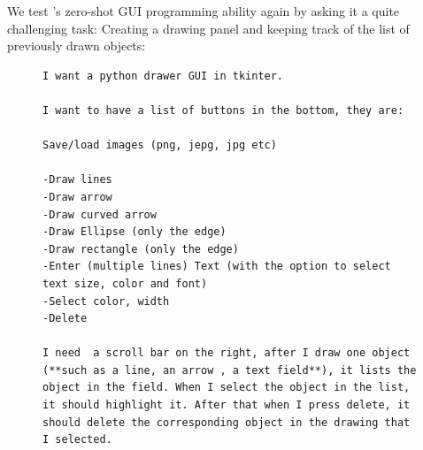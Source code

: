 We test \DV's zero-shot GUI programming ability again by asking it a quite challenging task: Creating a drawing panel and keeping track of the list of previously drawn objects:



\begin{figure}[H]
\begin{AIbox}{\DV}
\begin{verbatim}
I want a python drawer GUI in tkinter.

I want to have a list of buttons in the bottom, they are:

Save/load images (png, jepg, jpg etc)

-Draw lines
-Draw arrow
-Draw curved arrow
-Draw Ellipse (only the edge)
-Draw rectangle (only the edge)
-Enter (multiple lines) Text (with the option to select text size, color and font)
-Select color, width
-Delete

I need  a scroll bar on the right, after I draw one object (**such as a line, an arrow , a text field**), it lists the object in the field. When I select the object in the list, it should highlight it. After that when I press delete, it should delete the corresponding object in the drawing that I selected. 


\end{verbatim}
\end{AIbox}
\end{figure}
